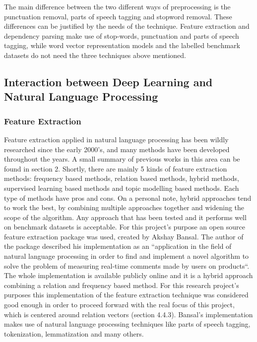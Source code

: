 \documentclass{sig-alternate}
\begin{document}
The main difference between the two different ways of preprocessing is the punctuation removal, parts of speech tagging and stopword removal. These differences can be justified by the needs of the technique. Feature extraction and dependency parsing make use of stop-words, punctuation and parts of speech tagging, while word vector representation models and the labelled benchmark datasets do not need the three techniques above mentioned.

\subsection{Interaction between Deep Learning and Natural Language Processing}
\subsubsection{Feature Extraction}
Feature extraction applied in natural language processing has been wildly researched since the early 2000's, and many methods have been developed throughout the years. A small summary of previous works in this area can be found in section 2. Shortly, there are mainly 5 kinds of feature extraction methods: frequency based methods, relation based methods, hybrid methods, supervised learning based methods and topic modelling based methods. Each type of methods have pros and cons. On a personal note, hybrid approaches tend to work the best, by combining multiple approaches together and widening the scope of the algorithm. Any approach that has been tested and it performs well on benchmark datasets is acceptable. For this project's purpose an open source feature extraction package was used, created by Akshay Bansal. The author of the package described his implementation as an ``application in the field of natural language processing in order to find and implement a novel algorithm to solve the problem of measuring real-time comments made by users on products``\cite{Bansal2014}. The whole implementation is available publicly online and it is a hybrid approach combining a relation and frequency based method. For this research project's purposes this implementation of the feature extraction technique was considered good enough in order to proceed forward with the real focus of this project, which is centered around relation vectors (section 4.4.3). Bansal's implementation makes use of natural language processing techniques like parts of speech tagging, tokenization, lemmatization and many others. 
\end{document}
